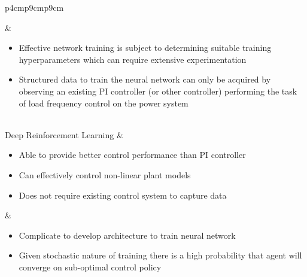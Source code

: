\begin{landscape}
\begin{longtable}{p{4cm}p{9cm}p{9cm}}
\begin{minipage}[t]{\linewidth}
	\end{minipage} &
	\begin{minipage}[t]{\linewidth}
	\begin{itemize}
		\itemsep0em
		\item Effective network training is subject to determining suitable training hyperparameters which can require extensive experimentation
		\item Structured data to train the neural network can only be acquired by observing an existing PI controller (or other controller) performing the task of load frequency control on the power system
	\end{itemize}
	\end{minipage}\\
	Deep Reinforcement Learning &
	\begin{minipage}[t]{\linewidth}
	\begin{itemize}
		\itemsep0em
		\item Able to provide better control performance than PI controller
		\item Can effectively control non-linear plant models
		\item Does not require existing control system to capture data
	\end{itemize}
	\end{minipage} &
	\begin{minipage}[t]{\linewidth}
	\begin{itemize}
		\itemsep0em
		\item Complicate to develop architecture to train neural network
		\item Given stochastic nature of training there is a high probability that agent will converge on sub-optimal control policy
	\end{itemize}
	\end{minipage}\\
	\bottomrule
	\end{longtable}

\end{landscape}